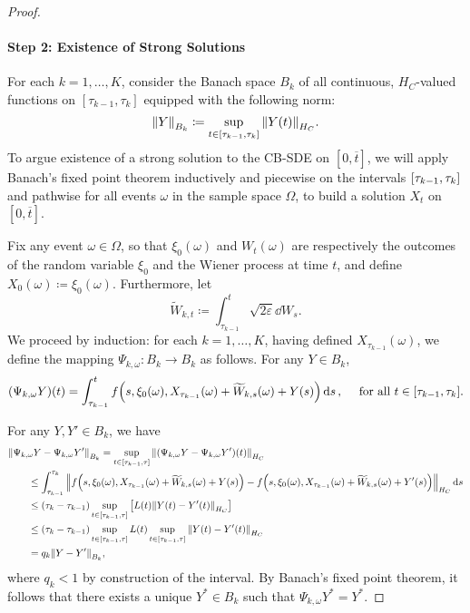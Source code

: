 \begin{proof}
  \paragraph{Step 2: Existence of Strong Solutions}

  For each \(k = 1, \ldots, K\), consider the Banach space \(B_{k}\) of all continuous, \(H_{C}\)-valued functions on \([\tau_{k-1}, \tau_{k}]\) equipped with the following norm:
  \[\norm{Y}_{B_{k}} \coloneqq \sup_{t \in [\tau_{k-1}, \tau_{k}]} \norm{Y(t)}_{H_{C}}.\]
  To argue existence of a strong solution to the CB-SDE on \([0, {\overline{t}}]\), we will apply Banach's fixed point theorem inductively and piecewise on the intervals \(\qty[\tau_{k-1}, \tau_{k}]\) and pathwise for all events \(\omega\) in the sample space \(\Omega\), to build a solution \({X}_{t}\) on \([0, \overline{t}]\).

  Fix any event \(\omega \in \Omega\), so that \(\xi_{0}(\omega)\) and \({W}_{t}(\omega)\) are respectively the outcomes of the random variable \(\xi_{0}\) and the Wiener process at time \(t\), and define \({X}_{0}(\omega) \coloneqq \xi_{0}(\omega)\). Furthermore, let
  \[
    \widetilde{W}_{k, t} \coloneqq \int_{\tau_{k-1}}^{t} \sqrt{2\varepsilon }\dd{ {W}_{s}}.
  \] We proceed by induction: for each \(k = 1, \ldots, K\), having defined \({X}_{\tau_{k-1}}(\omega)\), we define the mapping \(\Psi_{k, \omega} : B_{k} \to B_{k}\) as follows. For any \(Y \in B_{k}\),
  \begin{equation}
    (\Psi_{k, \omega} Y)(t) = \int_{\tau_{k-1}}^{t} {f}\qty(s, \xi_{0}(\omega), {X}_{\tau_{k-1}}(\omega) + \widetilde{W}_{k, s}(\omega) + Y(s)) \dd{s}, \quad \text{ for all } t \in [\tau_{k-1}, \tau_{k}]. \label{eqn:banach-iteration}
  \end{equation}

  For any \(Y, Y' \in B_{k}\), we have
  \begin{align*}
    &\norm{\Psi_{k, \omega} Y - \Psi_{k, \omega} Y'}_{B_{k}} = \sup_{t \in [\tau_{k-1}, \tau]} \norm{ (\Psi_{k, \omega} Y - \Psi_{k, \omega} Y')(t) }_{H_{C}} \\
    &\qquad\leq \int_{\tau_{k-1}}^{\tau_{k}} \norm{ {f}\qty(s, \xi_{0}(\omega), {X}_{\tau_{k-1}}(\omega) + \widetilde{W}_{k, s}(\omega) + Y(s)) - {f}\qty(s, \xi_{0}(\omega), {X}_{\tau_{k-1}}(\omega) + \widetilde{W}_{k, s}(\omega) + Y'(s))}_{H_{C}} \dd{s}\\
    &\qquad\leq (\tau_{k} - \tau_{k-1})\sup_{t \in [\tau_{k-1}, \tau]} \qty[{L}(t) \norm{Y(t) - Y'(t)}_{H_{C}}] \\
    &\qquad\leq (\tau_{k} - \tau_{k-1})\sup_{t \in [\tau_{k-1}, \tau]} {L}(t) \sup_{t \in [\tau_{k-1}, \tau]} \norm{Y(t) - Y'(t)}_{H_{C}} \\
    &\qquad= q_{k} \norm{Y - Y'}_{B_{k}},
  \end{align*}
  where \(q_{k} < 1\) by construction of the interval. By Banach's fixed point theorem, it follows that there exists a unique \(Y^{*} \in B_{k}\) such that \(\Psi_{k, \omega} Y^{*} = Y^{*}\).


\end{proof}

